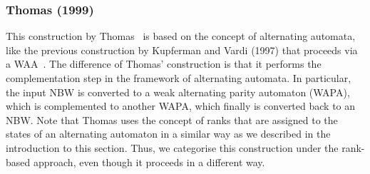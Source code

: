 


\subsubsection{Thomas (1999)}
\label{2_th99}
This construction by Thomas~\cite{1999_thomas} is based on the concept of alternating automata, like the previous construction by Kupferman and Vardi (1997) that proceeds via a WAA~\cite{1997_vardi}. The difference of Thomas' construction is that it performs the complementation step in the framework of alternating automata. In particular, the input NBW is converted to a weak alternating parity automaton (WAPA), which is complemented to another WAPA, which finally is converted back to an NBW. Note that Thomas uses the concept of ranks that are assigned to the states of an alternating automaton in a similar way as we described in the introduction to this section. Thus, we categorise this construction under the rank-based approach, even though it proceeds in a different way.


